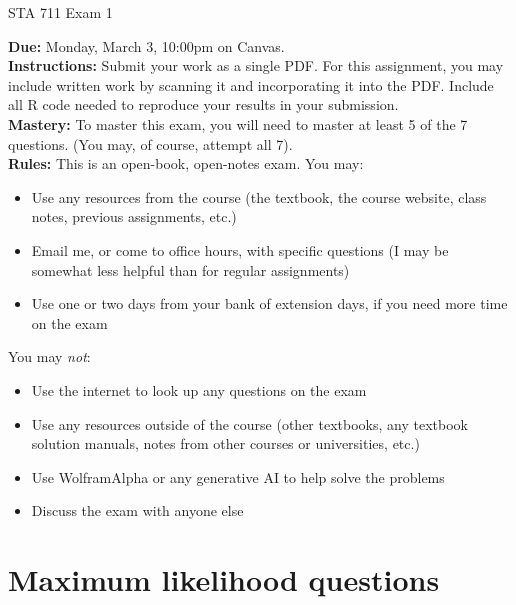 \documentclass[11pt]{article}
\begin{document}
\begin{center}
\Large
STA 711 Exam 1\\
\normalsize
\vspace{5mm}
\end{center}

\noindent \textbf{Due:} Monday, March 3, 10:00pm on Canvas.\\ 

\noindent \textbf{Instructions:} Submit your work as a single PDF. For this assignment, you may include written work by scanning it and incorporating it into the PDF. Include all R code needed to reproduce your results in your submission.\\

\noindent \textbf{Mastery:} To master this exam, you will need to master at least 5 of the 7 questions. (You may, of course, attempt all 7).\\

\noindent \textbf{Rules:} This is an open-book, open-notes exam. You may:
\begin{itemize}
\item Use any resources from the course (the textbook, the course website, class notes, previous assignments, etc.)
\item Email me, or come to office hours, with specific questions (I may be somewhat less helpful than for regular assignments)
\item Use one or two days from your bank of extension days, if you need more time on the exam
\end{itemize}
You may \textit{not}:
\begin{itemize}
\item Use the internet to look up any questions on the exam
\item Use any resources outside of the course (other textbooks, any textbook solution manuals, notes from other courses or universities, etc.)
\item Use WolframAlpha or any generative AI to help solve the problems
\item Discuss the exam with anyone else
\end{itemize}

\newpage

\section*{Maximum likelihood questions}
\end{document}
